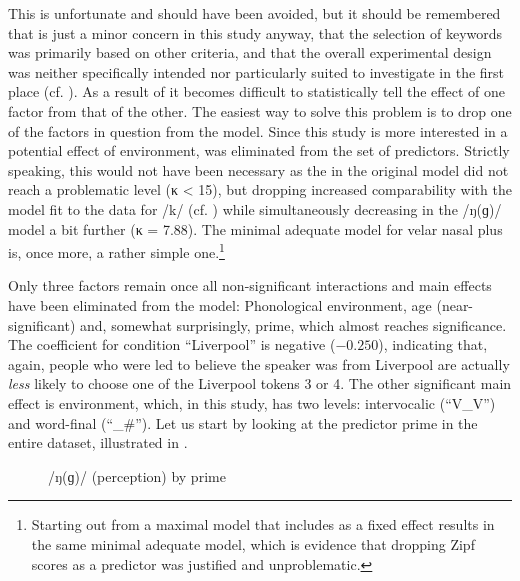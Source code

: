 This is unfortunate and should have been avoided, but it should be remembered that  is just a minor concern in this study anyway, that the selection of keywords was primarily based on other criteria, and that the overall experimental design was neither specifically intended nor particularly suited to investigate  in the first place (cf. ).
As a result of  it becomes difficult to statistically tell the effect of one factor from that of the other.
The easiest way to solve this problem is to drop one of the factors in question from the model.
Since this study is more interested in a potential effect of environment,  was eliminated from the set of predictors.
Strictly speaking, this would not have been necessary as the  in the original model did not reach a problematic level (κ < 15), but dropping  increased comparability with the model fit to the data for /k/ (cf. ) while simultaneously decreasing  in the /ŋ(ɡ)/ model a bit further (κ = 7.88).
The minimal adequate model for velar nasal plus is, once more, a rather simple one.\footnote{Starting out from a maximal model that includes  as a fixed effect results in the same minimal adequate model, which is evidence that dropping Zipf scores as a predictor was justified and unproblematic.}



Only three factors remain once all non-significant interactions and main effects have been eliminated from the model: Phonological environment, age (near-significant) and, somewhat surprisingly, prime, which almost reaches significance.
The coefficient for  condition ``Liverpool'' is negative (\ensuremath{-0.250}), indicating that, again, people who were led to believe the speaker was from Liverpool are actually \emph{less} likely to choose one of the Liverpool tokens 3 or 4.
The other significant main effect is environment, which, in this study, has two levels: intervocalic (``V\_V'') and word-final (``\_\#'').
Let us start by looking at the predictor prime in the entire dataset, illustrated in .
\begin{figure}[h]
	
		\resizebox{.49\linewidth}{!}{} 
	\caption{/ŋ(ɡ)/ (perception) by prime}
	\label{fig.bar.ng.tot.ext}
\end{figure}
